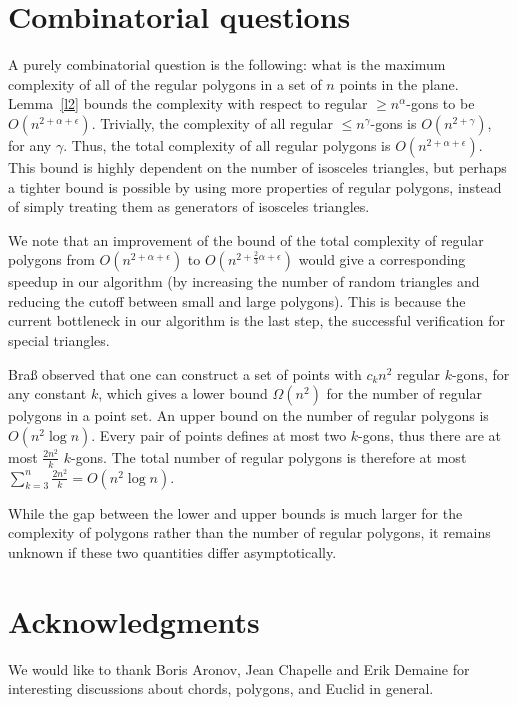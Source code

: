\documentclass{article}
\begin{document}
\section{Combinatorial questions}

A purely combinatorial question is the following: what is the maximum complexity of all of the regular polygons in a set of $n$ points in the plane.
Lemma~\ref{l2} bounds the complexity with respect to regular ${\geq}n^\alpha$-gons to be $O(n^{2+\alpha+\epsilon})$. Trivially, the complexity of all regular ${\leq}n^\gamma$-gons is $O(n^{2+\gamma})$, for any $\gamma$. Thus, the total complexity of all regular polygons is $O(n^{2+\alpha+\epsilon})$. This bound is highly dependent on the number of isosceles triangles, but perhaps a tighter bound is possible by using more properties of regular polygons, instead of simply treating them as generators of isosceles triangles.

We note that an improvement of the bound of the total complexity of regular polygons from $O(n^{2+\alpha+\epsilon})$ to $O(n^{2+\frac{2}{3}\alpha+\epsilon})$ would give a corresponding speedup in our algorithm (by increasing the number of random triangles and reducing the cutoff between small and large polygons). This is because the current bottleneck in our algorithm is the last step, the successful verification for special triangles.


Bra{\ss} observed that one can construct a set of points with $c_kn^2$ regular $k$-gons, for any constant $k$, which gives a lower bound $\Omega(n^2)$ for the number of regular polygons in a point set. An upper bound on the number of regular polygons is $O(n^2 \log n)$. Every pair of points defines at most two $k$-gons, thus there are at most $\frac{2n^2}{k}$ $k$-gons.  The total number of regular polygons is  therefore at most $\sum_{k=3}^n \frac{2n^2}{k} = O(n^2 \log n) $.

While the gap between the lower and upper bounds is much larger for the complexity of polygons rather than the number of regular polygons, it remains unknown if  these two quantities differ asymptotically.
\section{Acknowledgments}

We would like to thank Boris Aronov, Jean Chapelle and Erik Demaine for
interesting discussions about chords, polygons, and Euclid in general.
\end{document}
